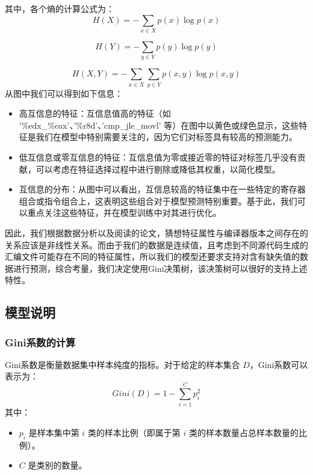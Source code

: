 其中，各个熵的计算公式为：
\begin{equation}
H(X) = -\sum_{x \in X} p(x) \log p(x)
\label{eq:entropy_x}
\end{equation}

\begin{equation}
H(Y) = -\sum_{y \in Y} p(y) \log p(y)
\label{eq:entropy_y}
\end{equation}

\begin{equation}
H(X, Y) = -\sum_{x \in X} \sum_{y \in Y} p(x, y) \log p(x, y)
\label{eq:joint_entropy}
\end{equation}
从图中我们可以得到如下信息：
\begin{itemize}
    \item 高互信息的特征：互信息值高的特征（如 '\%edx\_\%eax'、'\%r8d'、'cmp\_jle\_movl' 等）在图中以黄色或绿色显示，这些特征是我们在模型中特别需要关注的，因为它们对标签具有较高的预测能力。
    \item 低互信息或零互信息的特征：互信息值为零或接近零的特征对标签几乎没有贡献，可以考虑在特征选择过程中进行剔除或降低其权重，以简化模型。
    \item 互信息的分布：从图中可以看出，互信息较高的特征集中在一些特定的寄存器组合或指令组合上，这表明这些组合对于模型预测特别重要。基于此，我们可以重点关注这些特征，并在模型训练中对其进行优化。
\end{itemize}

因此，我们根据数据分析以及阅读的论文，猜想特征属性与编译器版本之间存在的关系应该是非线性关系。而由于我们的数据是连续值，且考虑到不同源代码生成的汇编文件可能存在不同的特征属性，所以我们的模型还要求支持对含有缺失值的数据进行预测，综合考量，我们决定使用Gini决策树，该决策树可以很好的支持上述特性。
    \subsection{模型说明}
    \subsubsection{Gini系数的计算}
Gini系数是衡量数据集中样本纯度的指标。对于给定的样本集合 \(D\)，Gini系数可以表示为：
\begin{equation}
Gini(D) = 1 - \sum_{i=1}^{C} p_i^2
\end{equation}
其中：
\begin{itemize}
  \item \(p_i\) 是样本集中第 \(i\) 类的样本比例（即属于第 \(i\) 类的样本数量占总样本数量的比例）。
  \item \(C\) 是类别的数量。
\end{itemize}





